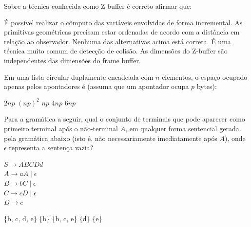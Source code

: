 \documentclass[12pt, addpoints]{exam}
\begin{document}
\begin{questions}
\question
Sobre a técnica conhecida como Z-buffer é correto afirmar que:
\begin{choices}
\choice É possível realizar o cômputo das variáveis envolvidas de forma incremental.
\choice As primitivas geométricas precisam estar ordenadas de acordo com a distância em relação ao observador. 
\choice Nenhuma das alternativas acima está correta. 
\choice É uma técnica muito comum de detecção de colisão. 
\choice As dimensões do Z-buffer são independentes das dimensões do frame buffer. 
\end{choices}

\question
Em uma lista circular duplamente encadeada com \( n \) elementos, o espaço ocupado apenas pelos apontadores é (assuma que um apontador ocupa \( p \) bytes):
\begin{choices}
\choice \( 2np \)
\choice \( (np)^2 \)
\choice \( np \)
\choice \( 4np \)
\choice \( 6np \)
\end{choices}

\question
Para a gramática a seguir, qual o conjunto de terminais que pode aparecer como primeiro terminal após o não-terminal \( A \), em qualquer forma sentencial gerada pela gramática abaixo (isto é, não necessariamente imediatamente após \( A \)), onde \( \epsilon \) representa a sentença vazia?

$S \rightarrow ABCDd$\\
$A \rightarrow aA \mid \epsilon$\\
$B \rightarrow bC \mid \epsilon$\\
$C \rightarrow cD \mid \epsilon$\\
$D \rightarrow e$\\
\begin{choices}
\choice \{b, c, d, e\}
\choice \{b\}
\choice \{b, c, e\}
\choice \{d\}
\choice \{e\}
\end{choices}



    \end{questions}
    
\end{document}
